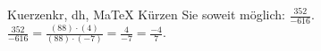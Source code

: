 \begin{MAufgabe}{Kuerzen}{kr, dh, MaTeX}
K\"urzen Sie soweit m\"oglich: $\frac{352}{-616}$.\\ 
\ifLsg\MLoesung
\quad $\frac{352}{-616}=\frac{(88)\cdot(4)}{(88)\cdot(-7)}=\frac{4}{-7}=\frac{-4}{7}$.\else\relax\fi
 \end{MAufgabe}